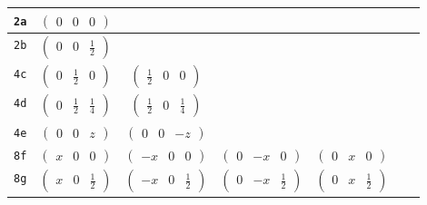 \documentclass[fleqn,9pt,landscape]{jsarticle}
\begin{document}
\begin{center}
\begin{longtable}{ccccccc}
{\tt 2a} & $ \begin{pmatrix} 0 & 0 & 0 \end{pmatrix} $ & $  $ & $  $ & $  $ & $  $ & $  $ \\ \hline
{\tt 2b} & $ \begin{pmatrix} 0 & 0 & \frac{1}{2} \end{pmatrix} $ & $  $ & $  $ & $  $ & $  $ & $  $ \\ \hline
{\tt 4c} & $ \begin{pmatrix} 0 & \frac{1}{2} & 0 \end{pmatrix} $ & $ \begin{pmatrix} \frac{1}{2} & 0 & 0 \end{pmatrix} $ & $  $ & $  $ & $  $ & $  $ \\ \hline
{\tt 4d} & $ \begin{pmatrix} 0 & \frac{1}{2} & \frac{1}{4} \end{pmatrix} $ & $ \begin{pmatrix} \frac{1}{2} & 0 & \frac{1}{4} \end{pmatrix} $ & $  $ & $  $ & $  $ & $  $ \\ \hline
{\tt 4e} & $ \begin{pmatrix} 0 & 0 & z \end{pmatrix} $ & $ \begin{pmatrix} 0 & 0 & - z \end{pmatrix} $ & $  $ & $  $ & $  $ & $  $ \\ \hline
{\tt 8f} & $ \begin{pmatrix} x & 0 & 0 \end{pmatrix} $ & $ \begin{pmatrix} - x & 0 & 0 \end{pmatrix} $ & $ \begin{pmatrix} 0 & - x & 0 \end{pmatrix} $ & $ \begin{pmatrix} 0 & x & 0 \end{pmatrix} $ & $  $ & $  $ \\ \hline
{\tt 8g} & $ \begin{pmatrix} x & 0 & \frac{1}{2} \end{pmatrix} $ & $ \begin{pmatrix} - x & 0 & \frac{1}{2} \end{pmatrix} $ & $ \begin{pmatrix} 0 & - x & \frac{1}{2} \end{pmatrix} $ & $ \begin{pmatrix} 0 & x & \frac{1}{2} \end{pmatrix} $ & $  $ & $  $ \\ \hline

\end{longtable}
\end{center}
\end{document}
